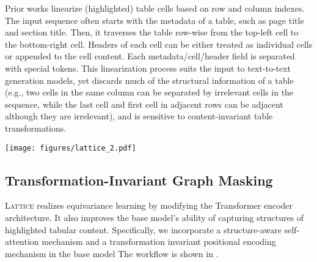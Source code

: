 \documentclass[11pt]{article}
\newcommand{\stitle}[1]{\vspace{1ex} \noindent{\bf #1.}}
\newcommand{\model}{\mbox{\textsc{Lattice}}\xspace}
\begin{document}
\stitle{Input Format}
Prior works \citep{kale2020text,chen2020logical,su2021plan} linearize (highlighted) table cells based on row and column indexes.
The input sequence often starts with the metadata of a table, such as page title and section title. 
Then, it traverses the table row-wise from the top-left cell to the bottom-right cell.
Headers of each cell can be either treated as individual cells or appended to the cell content.
Each metadata/cell/header field is separated with special tokens.
This linearization process suits the input to text-to-text generation models, yet discards much of the structural information of a table (e.g., two cells in the same column can be separated by irrelevant cells in the sequence, while the last cell and first cell in adjacent rows can be adjacent although they are irrelevant), and is sensitive to content-invariant table transformations.


\begin{figure*}[t]
  \begin{center}
    \texttt{[image: figures/lattice\_2.pdf]}
  \end{center}
  \vspace{-0.5em}
  \caption{Attention flows of the base model and \model. 
  In this example, we adopt the input format which appends headers to each cell, so headers can be seen as part of the cell content. 
  We omit the attention flows among tokens within a cell, as they are in the same type of the flows between headers and corresponding cells.
   represents the relative position between tokens at both ends of the attention flow, where  and  are absolute positions of tokens in the linearized table and  is the max relative position allowed.
  The base model has a complete attention graph among all cells with relative positions based on linear distance. 
  \model prunes the attention flow based on the table layout and assigns transformation-invariant relative positions between cells.
  }
  \label{fig/lattice}
\end{figure*}

\subsection{Transformation-Invariant Graph Masking}
\label{sec/method/mask}

\model realizes equivariance learning by modifying the Transformer encoder architecture. It also improves the base model's ability of capturing structures of highlighted tabular content.
Specifically, we incorporate a structure-aware self-attention mechanism and a transformation invariant positional encoding mechanism in the base model
The workflow is shown in .
\end{document}

